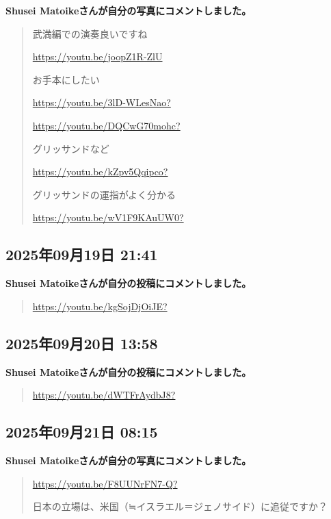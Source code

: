 \textbf{Shusei Matoikeさんが自分の写真にコメントしました。}

\begin{quote}
武満編での演奏良いですね

\url{https://youtu.be/joopZ1R-ZlU}

お手本にしたい

\url{https://youtu.be/3lD-WLesNao?}

\url{https://youtu.be/DQCwG70mohc?}

グリッサンドなど

\url{https://youtu.be/kZpv5Qqipco?}

グリッサンドの運指がよく分かる

\url{https://youtu.be/wV1F9KAuUW0?}
\end{quote}

\subsection*{2025年09月19日 21:41}

\textbf{Shusei Matoikeさんが自分の投稿にコメントしました。}

\begin{quote}
\url{https://youtu.be/kgSojDjOiJE?}
\end{quote}

\subsection*{2025年09月20日 13:58}

\textbf{Shusei Matoikeさんが自分の投稿にコメントしました。}

\begin{quote}
\url{https://youtu.be/dWTFrAydbJ8?}
\end{quote}

\subsection*{2025年09月21日 08:15}

\textbf{Shusei Matoikeさんが自分の写真にコメントしました。}

\begin{quote}
\url{https://youtu.be/F8UUNrFN7-Q?}

日本の立場は、米国（≒イスラエル＝ジェノサイド）に追従ですか？
\end{quote}

